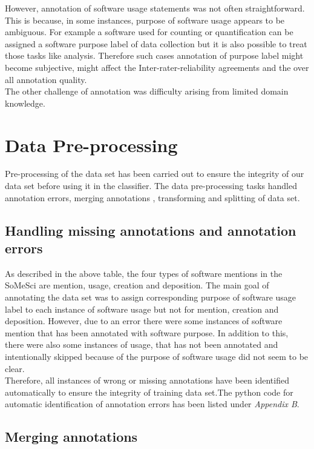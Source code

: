 However, annotation of software usage statements was not often straightforward. This is because, in some instances, purpose of software usage appears to be ambiguous. For example a software used for counting or quantification can be assigned a software purpose label of  data collection but it is also possible to treat those tasks like analysis. Therefore such cases annotation of purpose label might become subjective, might affect the Inter-rater-reliability agreements and the  over all annotation quality.\\

The other challenge of annotation was difficulty arising from limited domain knowledge. 

\section{Data Pre-processing}
\label{sec:dataset:preprocessing}
Pre-processing of the data set has been carried out to ensure the integrity of our data set before using it in the classifier. The data pre-processing tasks handled annotation errors, merging annotations , transforming and splitting of data set. 

\subsection{Handling missing annotations and annotation errors }
\label{subsec:dataset:preprocessing:handlingerrors}

As described in the above table, the four types of software mentions in the SoMeSci are mention, usage, creation and deposition. The main goal of annotating the data set was to assign corresponding purpose of software usage label to each instance of software usage but not for mention, creation and deposition. However, due to an error there were some instances of software mention that has been annotated with software purpose. In addition to this, there were also some instances of usage, that has not been annotated and intentionally skipped because of the purpose of software usage did not seem to be clear. \\

Therefore, all instances of wrong or missing annotations have been identified automatically to ensure the integrity of training data set.The python code for automatic identification of annotation errors has been listed under \emph{Appendix B}.

\subsection{Merging annotations}
\label{subsec:dataset:preprocessing:Merging}

